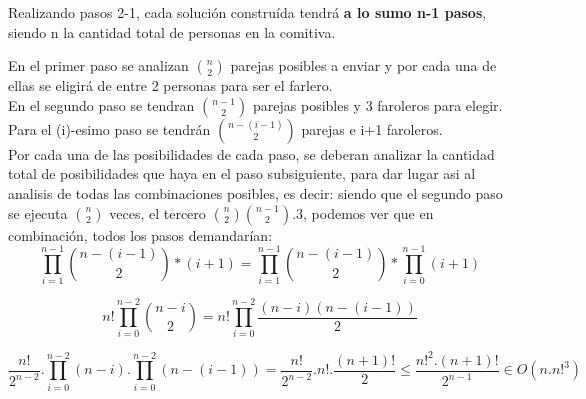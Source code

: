 \vspace*{1em}

Realizando pasos 2-1, cada solución construída tendrá {\bf a lo sumo n-1 pasos}, siendo n la cantidad total de personas en la comitiva.

En el primer paso se analizan $\binom {n}{2}$ parejas posibles a enviar y por cada una de ellas se eligirá de entre 2 personas para ser el farlero.\\

En el segundo paso se tendran $\binom {n-1}{2}$ parejas posibles y 3 faroleros para elegir.\\

Para el (i)-esimo paso se tendrán $\binom {n-(i-1)}{2}$ parejas e i+1 faroleros.\\

Por cada una de las posibilidades de cada paso, se deberan analizar la cantidad total de
posibilidades que haya en el paso subsiguiente, para dar lugar asi al analisis de todas las combinaciones posibles, es decir: siendo que el segundo paso se ejecuta $\binom {n}{2}$ veces, el tercero $\binom {n}{2} \binom{n-1} {2}.3$, podemos ver que en combinación, todos los pasos demandarían:
\[
\prod_{i=1}^{n-1}\binom {n-(i-1)}{2}*(i+1) = \prod_{i=1}^{n-1}\binom {n-(i-1)}{2} * \prod_{i=0}^{n-1}(i+1)
\]

\[
n!\prod_{i=0}^{n-2}\binom {n-i}{2} = n!\prod_{i=0}^{n-2}\frac{(n-i)(n-(i-1))}{2}
\]

\[
\frac{ n!}{2^{n-2}}.\prod_{i=0}^{n-2}(n-i).\prod_{i=0}^{n-2}(n-(i-1)) = \frac{n!}{2^{n-2}}.n!.\frac{(n+1)!}{2}\leq \frac{n!^{2}.(n+1)!}{2^{n-1}}\in O(n.n!^{3})
\]